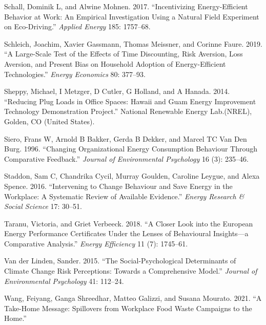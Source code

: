 \documentclass[
  11pt,
]{article}
\newlength{\cslhangindent}
\newlength{\cslentryspacingunit} %
\newenvironment{CSLReferences}[2] %
 {%
  \setlength{\parindent}{0pt}
  \ifodd #1
  \let\oldpar\par
  \def\par{\hangindent=\cslhangindent\oldpar}
  \fi
  \setlength{\parskip}{#2\cslentryspacingunit}
 }%
 {}
\begin{document}
\begin{CSLReferences}{1}{0}
\leavevmode{}%
Schall, Dominik L, and Alwine Mohnen. 2017. {``Incentivizing
Energy-Efficient Behavior at Work: An Empirical Investigation Using a
Natural Field Experiment on Eco-Driving.''} \emph{Applied Energy} 185:
1757--68.

\leavevmode{}%
Schleich, Joachim, Xavier Gassmann, Thomas Meissner, and Corinne Faure.
2019. {``A Large-Scale Test of the Effects of Time Discounting, Risk
Aversion, Loss Aversion, and Present Bias on Household Adoption of
Energy-Efficient Technologies.''} \emph{Energy Economics} 80: 377--93.

\leavevmode{}%
Sheppy, Michael, I Metzger, D Cutler, G Holland, and A Hanada. 2014.
{``Reducing Plug Loads in Office Spaces: Hawaii and Guam Energy
Improvement Technology Demonstration Project.''} National Renewable
Energy Lab.(NREL), Golden, CO (United States).

\leavevmode{}%
Siero, Frans W, Arnold B Bakker, Gerda B Dekker, and Marcel TC Van Den
Burg. 1996. {``Changing Organizational Energy Consumption Behaviour
Through Comparative Feedback.''} \emph{Journal of Environmental
Psychology} 16 (3): 235--46.

\leavevmode{}%
Staddon, Sam C, Chandrika Cycil, Murray Goulden, Caroline Leygue, and
Alexa Spence. 2016. {``Intervening to Change Behaviour and Save Energy
in the Workplace: A Systematic Review of Available Evidence.''}
\emph{Energy Research \& Social Science} 17: 30--51.

\leavevmode{}%
Taranu, Victoria, and Griet Verbeeck. 2018. {``A Closer Look into the
European Energy Performance Certificates Under the Lenses of Behavioural
Insights---a Comparative Analysis.''} \emph{Energy Efficiency} 11 (7):
1745--61.

\leavevmode{}%
Van der Linden, Sander. 2015. {``The Social-Psychological Determinants
of Climate Change Risk Perceptions: Towards a Comprehensive Model.''}
\emph{Journal of Environmental Psychology} 41: 112--24.

\leavevmode{}%
Wang, Feiyang, Ganga Shreedhar, Matteo Galizzi, and Susana Mourato.
2021. {``A Take-Home Message: Spillovers from Workplace Food Waste
Campaigns to the Home.''}


\end{CSLReferences}
\end{document}
